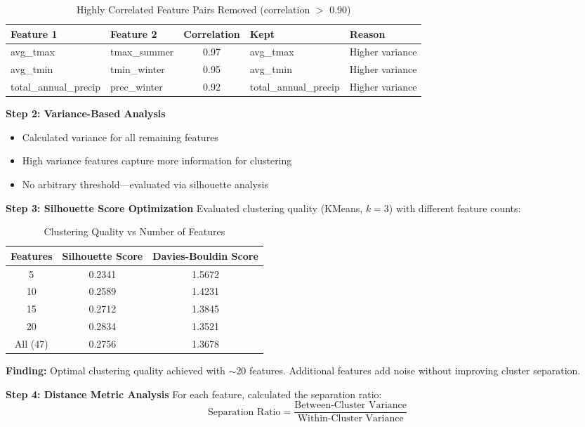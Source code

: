 \begin{table}[H]
\centering
\caption{Highly Correlated Feature Pairs Removed (correlation $>$ 0.90)}
\label{tab:multicollinearity_unsupervised}
\begin{tabular}{|l|l|c|l|l|}
\hline
\textbf{Feature 1} & \textbf{Feature 2} & \textbf{Correlation} & \textbf{Kept} & \textbf{Reason} \\
\hline
avg\_tmax & tmax\_summer & 0.97 & avg\_tmax & Higher variance \\
avg\_tmin & tmin\_winter & 0.95 & avg\_tmin & Higher variance \\
total\_annual\_precip & prec\_winter & 0.92 & total\_annual\_precip & Higher variance \\
\hline
\end{tabular}
\end{table}

\textbf{Step 2: Variance-Based Analysis}
\begin{itemize}
    \item Calculated variance for all remaining features
    \item High variance features capture more information for clustering
    \item No arbitrary threshold---evaluated via silhouette analysis
\end{itemize}

\textbf{Step 3: Silhouette Score Optimization}
Evaluated clustering quality (KMeans, $k=3$) with different feature counts:

\begin{table}[H]
\centering
\caption{Clustering Quality vs Number of Features}
\label{tab:silhouette_analysis}
\begin{tabular}{|c|c|c|}
\hline
\textbf{Features} & \textbf{Silhouette Score} & \textbf{Davies-Bouldin Score} \\
\hline
5 & 0.2341 & 1.5672 \\
10 & 0.2589 & 1.4231 \\
15 & 0.2712 & 1.3845 \\
20 & 0.2834 & 1.3521 \\
All (47) & 0.2756 & 1.3678 \\
\hline
\end{tabular}
\end{table}

\textbf{Finding:} Optimal clustering quality achieved with $\sim$20 features. Additional features add noise without improving cluster separation.

\textbf{Step 4: Distance Metric Analysis}
For each feature, calculated the separation ratio:
\begin{equation}
    \text{Separation Ratio} = \frac{\text{Between-Cluster Variance}}{\text{Within-Cluster Variance}}
\end{equation}

